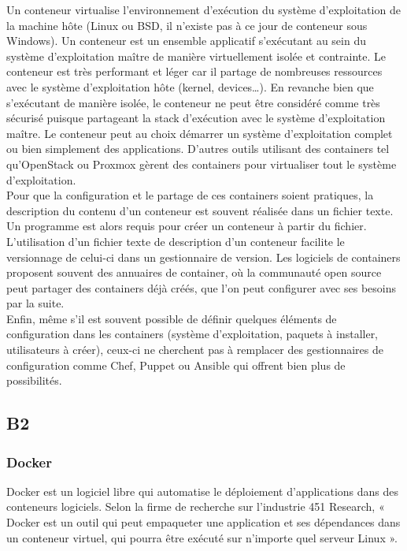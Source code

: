         Un conteneur virtualise l'environnement d'exécution du système d'exploitation de la machine hôte (Linux ou BSD, il n'existe pas à ce jour de conteneur sous Windows). Un conteneur est un ensemble applicatif s'exécutant au sein du système d'exploitation maître de manière virtuellement isolée et contrainte. Le conteneur est très performant et léger car il partage de nombreuses ressources avec le système d'exploitation hôte (kernel, devices\dots). En revanche bien que s'exécutant de manière isolée, le conteneur ne peut être considéré comme très sécurisé puisque partageant la stack d'exécution avec le système d'exploitation maître. Le conteneur peut au choix démarrer un système d'exploitation complet ou bien simplement des applications. D'autres outils utilisant des containers tel qu'OpenStack ou Proxmox gèrent des containers pour virtualiser tout le système d'exploitation.\\

        Pour que la configuration et le partage de ces containers soient pratiques, la description du contenu d'un conteneur est souvent réalisée dans un fichier texte. Un programme est alors requis pour créer un conteneur à partir du fichier. L'utilisation d'un fichier texte de description d'un conteneur facilite le versionnage de celui-ci dans un gestionnaire de version. Les logiciels de containers proposent souvent des annuaires de container, où la communauté open source peut partager des containers déjà créés, que l'on peut configurer avec ses besoins par la suite.\\

        Enfin, même s'il est souvent possible de définir quelques éléments de configuration dans les containers (système d'exploitation, paquets à installer, utilisateurs à créer), ceux-ci ne cherchent pas à remplacer des gestionnaires de configuration comme Chef, Puppet ou Ansible qui offrent bien plus de possibilités.

\subsection*{B2}

    \subsubsection*{Docker}
    Docker est un logiciel libre qui automatise le déploiement d'applications dans des conteneurs logiciels. Selon la firme de recherche sur l'industrie 451 Research, « Docker est un outil qui peut empaqueter une application et ses dépendances dans un conteneur virtuel, qui pourra être exécuté sur n'importe quel serveur Linux ».\\

